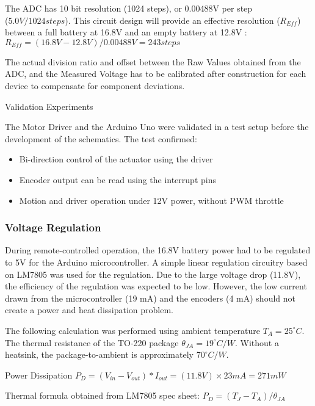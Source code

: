 The ADC has 10 bit resolution (1024 steps), or 0.00488V per step \\($5.0V / 1024 steps$). This circuit design will provide an effective resolution ($R_{Eff}$) between a full battery at 16.8V and an empty battery at 12.8V : 
\\ $R_{Eff} = (16.8V - 12.8V) / 0.00488V = 243 steps$

The actual division ratio and offset between the Raw Values obtained from the ADC, and the Measured Voltage has to be calibrated after construction for each device to compensate for component deviations. 

Validation Experiments

The Motor Driver and the Arduino Uno were validated in a test setup before the development of the schematics. The test confirmed:
\begin{itemize}
    \item Bi-direction control of the actuator using the driver
    \item Encoder output can be read using the interrupt pins
    \item Motion and driver operation under 12V power, without PWM throttle
\end{itemize}

\subsubsection{Voltage Regulation}
\label{subsubsection:exploration-1-voltage-regulation}

During remote-controlled operation, the 16.8V battery power had to be regulated to 5V for the Arduino microcontroller. A simple linear regulation circuitry based on LM7805 was used for the regulation. Due to the large voltage drop (11.8V), the efficiency of the regulation was expected to be low. However, the low current drawn from the microcontroller (19 mA) and the encoders (4 mA) should not create a power and heat dissipation problem.

The following calculation was performed using ambient temperature $T_A = 25^{\circ}C$. The thermal resistance of the TO-220 package $\theta_{JA} = 19^{\circ}C/W$. Without a heatsink, the package-to-ambient is approximately $70 ^{\circ}C/W$.

Power Dissipation $P_D = (V_{in} - V_{out}) * I_{out} = (11.8V) \times 23mA = 271mW$

Thermal formula obtained from LM7805 spec sheet:
$P_D = (T_J - T_A) / \theta_{JA}$

